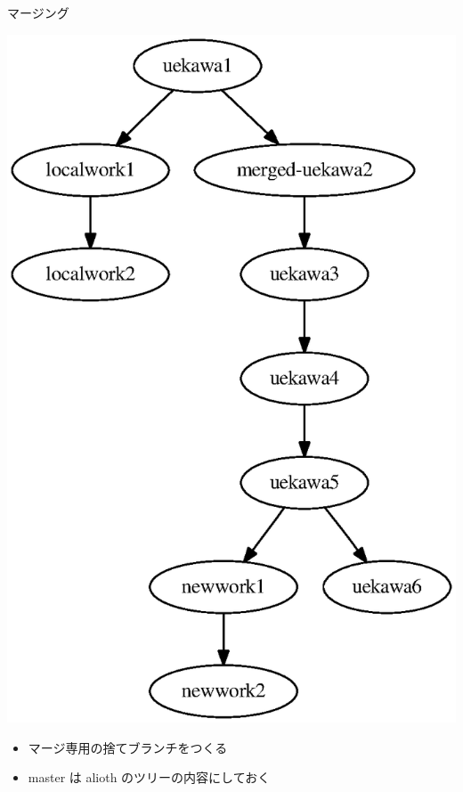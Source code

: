 \begin{frame}{マージング}

\begin{minipage}{0.5\hsize}
 \includegraphics[height=0.8\vsize]{image200901/gitbranch.eps}
\end{minipage}
\begin{minipage}{0.4\hsize}
 \begin{itemize}
  \item マージ専用の捨てブランチをつくる
  \item master は alioth のツリーの内容にしておく
 \end{itemize}
\end{minipage}


\end{frame}

